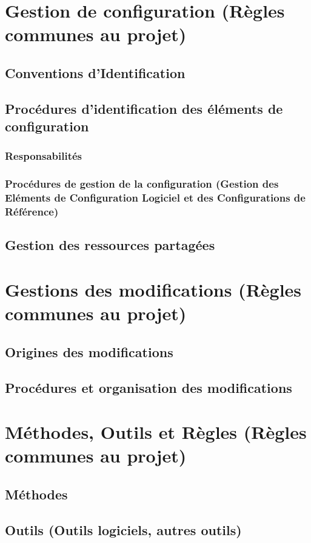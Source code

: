\section{Gestion de configuration (Règles communes au projet)}
\subsection{Conventions d’Identification}
\subsection{Procédures d’identification des éléments de configuration} 
\subsubsection{Responsabilités}
\subsubsection{Procédures de gestion de la configuration (Gestion des Eléments de Configuration Logiciel et des Configurations de Référence)}
\subsection{Gestion des ressources partagées}
\section{Gestions des modifications  (Règles communes au projet)}
\subsection{Origines des modifications}
\subsection{Procédures et organisation des modifications}

\section{Méthodes, Outils et Règles (Règles communes au projet)}
\subsection{Méthodes}
\subsection{Outils (Outils logiciels, autres outils)}
